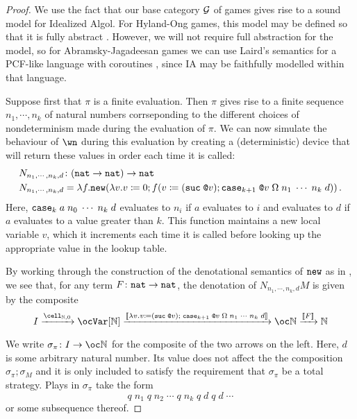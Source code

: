 \documentclass{article}
\begin{document}
\begin{proof}
  We use the fact that our base category $\mathcal G$ of games gives rise to a sound model for Idealized Algol.  
  For Hyland-Ong games, this model may be defined so that it is fully abstract \cite{SamsonGuyIAPassive}.  
  However, we will not require full abstraction for the model, so for Abramsky-Jagadeesan games we can use Laird's semantics for a PCF-like language with coroutines \cite{LairdCofCommCom}, since IA may be faithfully modelled within that language.

  Suppose first that $\pi$ is a finite evaluation.  
  Then $\pi$ gives rise to a finite sequence $n_1,\cdots, n_k$ of natural numbers corrseponding to the different choices of nondeterminism made during the evaluation of $\pi$.  
  We can now simulate the behaviour of $\wn$ during this evaluation by creating a (deterministic) device that will return these values in order each time it is called:
  \begin{align*}
    &N_{n_1,\cdots,n_k,d} \colon ({\mathtt{nat}} \to {\mathtt{nat}}) \to {\mathtt{nat}} \\
    &N_{n_1,\cdots,n_k,d} = \lambda f . {\mathtt{new}} (\lambda v.v\coloneqq 0; f(v\coloneqq({\mathtt{suc\;}}\texttt{@} v); {\mathtt{case}}_{k+1}\;\texttt{@} v\;\Omega\;n_1\;\cdots\;n_k\;d))\,.
  \end{align*}
  Here, ${\mathtt{case}}_k\;a\;n_0\;\cdots\;n_k\;d$ evaluates to $n_i$ if $a$ evaluates to $i$ and evaluates to $d$ if $a$ evaluates to a value greater than $k$.  
  This function maintains a new local variable $v$, which it increments each time it is called before looking up the appropriate value in the lookup table.

  By working through the construction of the denotational semantics of ${\mathtt{new}}$ as in \cite{SamsonGuyIAPassive}, we see that, for any term $F\colon{\mathtt{nat}}\to{\mathtt{nat}}$, the denotation of $N_{n_1,\cdots,n_k,d}M$ is given by the composite
  \[
    I \xrightarrow{\cell_{\bN,0}}
      \oc \Var[\bN] \xrightarrow{\deno{\lambda v.v\coloneqq (\suc \deref v);\;\case_{k+1}\;\deref v\;\Omega\;n_1\;\cdots\;n_k\;d}}
        \oc \bN \xrightarrow{\deno{F}}
          \bN
    \]

  We write $\sigma_\pi\from I\to \oc\bN$ for the composite of the two arrows on the left.  
  Here, $d$ is some arbitrary natural number.  
  Its value does not affect the the composition $\sigma_\pi;\sigma_M$ and it is only included to satisfy the requirement that $\sigma_\pi$ be a total strategy.  
  Plays in $\sigma_\pi$ take the form
  \[
    q\;n_1\;q\;n_2\;\cdots\;q\;n_k\;q\;d\;q\;d\;\cdots
    \]
  or some subsequence thereof.  


\end{proof}
\end{document}
